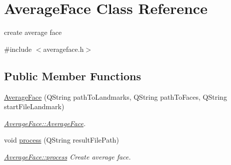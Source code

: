 \hypertarget{class_average_face}{\section{Average\+Face Class Reference}
\label{class_average_face}
}


create average face  




{\ttfamily \#include $<$averageface.\+h$>$}

\subsection*{Public Member Functions}
\begin{DoxyCompactItemize}
\item 
\hyperlink{class_average_face_a7e54fc51542be2cf483f01119051a1db}{Average\+Face} (Q\+String path\+To\+Landmarks, Q\+String path\+To\+Faces, Q\+String start\+File\+Landmark)
\begin{DoxyCompactList}\small\item\em \hyperlink{class_average_face_a7e54fc51542be2cf483f01119051a1db}{Average\+Face\+::\+Average\+Face}. \end{DoxyCompactList}\item 
void \hyperlink{class_average_face_af0676bea368dfb3b9352c3c08f0939a4}{process} (Q\+String result\+File\+Path)
\begin{DoxyCompactList}\small\item\em \hyperlink{class_average_face_af0676bea368dfb3b9352c3c08f0939a4}{Average\+Face\+::process} Create average face. \end{DoxyCompactList}\end{DoxyCompactItemize}
